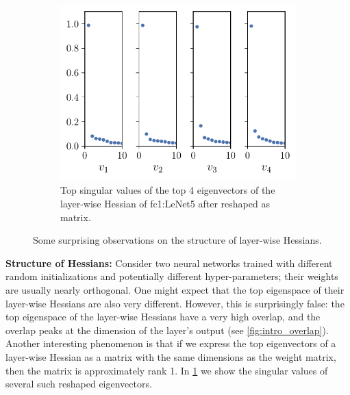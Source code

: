 \begin{figure}[th]
\begin{subfigure}[b]{0.39\textwidth}
        \includegraphics[width=\textwidth]{Figures/Eigenvec_single/Top_Eigenvector_sigs_CIFAR10_Exp1_LeNet5_fixlr0.01R1_E-1fc1.pdf}
        \caption{Top singular values of the top 4 eigenvectors of the layer-wise Hessian of fc1:LeNet5 after reshaped as matrix.}
        \label{fig:intro_lowrank}
    \end{subfigure}
    \caption{Some surprising observations on the structure of layer-wise Hessians.}
    \label{fig:intro_figs}
\end{figure}
\textbf{Structure of Hessians:} Consider two neural networks trained with different random initializations and potentially different hyper-parameters; their weights are usually nearly orthogonal. One might expect that the top eigenspace of their layer-wise Hessians are also very different. However, this is surprisingly false: the top eigenspace of the layer-wise Hessians have a very high overlap, and the overlap peaks at the dimension of the layer's output (see \cref{fig:intro_overlap}).
Another interesting phenomenon is that if we express the top eigenvectors of a layer-wise Hessian as a matrix with the same dimensions as the weight matrix, then the matrix is approximately rank 1. In \cref{fig:intro_lowrank} we show the singular values of several such reshaped eigenvectors. 

